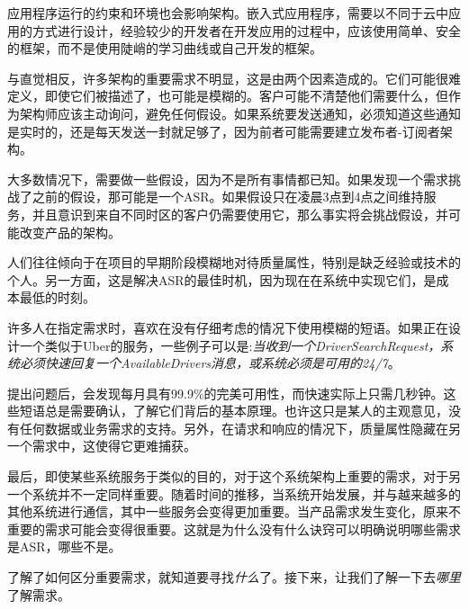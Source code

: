 应用程序运行的约束和环境也会影响架构。嵌入式应用程序，需要以不同于云中应用的方式进行设计，经验较少的开发者在开发应用的过程中，应该使用简单、安全的框架，而不是使用陡峭的学习曲线或自己开发的框架。


与直觉相反，许多架构的重要需求不明显，这是由两个因素造成的。它们可能很难定义，即使它们被描述了，也可能是模糊的。客户可能不清楚他们需要什么，但作为架构师应该主动询问，避免任何假设。如果系统要发送通知，必须知道这些通知是实时的，还是每天发送一封就足够了，因为前者可能需要建立发布者-订阅者架构。 

大多数情况下，需要做一些假设，因为不是所有事情都已知。如果发现一个需求挑战了之前的假设，那可能是一个ASR。如果假设只在凌晨3点到4点之间维持服务，并且意识到来自不同时区的客户仍需要使用它，那么事实将会挑战假设，并可能改变产品的架构。

人们往往倾向于在项目的早期阶段模糊地对待质量属性，特别是缺乏经验或技术的个人。另一方面，这是解决ASR的最佳时机，因为现在在系统中实现它们，是成本最低的时刻。

许多人在指定需求时，喜欢在没有仔细考虑的情况下使用模糊的短语。如果正在设计一个类似于Uber的服务，一些例子可以是:\textit{当收到一个DriverSearchRequest，系统必须快速回复一个AvailableDrivers消息，或系统必须是可用的24/7}。

提出问题后，会发现每月具有99.9\%的完美可用性，而快速实际上只需几秒钟。这些短语总是需要确认，了解它们背后的基本原理。也许这只是某人的主观意见，没有任何数据或业务需求的支持。另外，在请求和响应的情况下，质量属性隐藏在另一个需求中，这使得它更难捕获。

最后，即使某些系统服务于类似的目的，对于这个系统架构上重要的需求，对于另一个系统并不一定同样重要。随着时间的推移，当系统开始发展，并与越来越多的其他系统进行通信，其中一些服务会变得更加重要。当产品需求发生变化，原来不重要的需求可能会变得很重要。这就是为什么没有什么诀窍可以明确说明哪些需求是ASR，哪些不是。 

了解了如何区分重要需求，就知道要寻找\textit{什么}了。接下来，让我们了解一下去\textit{哪里}了解需求。




























